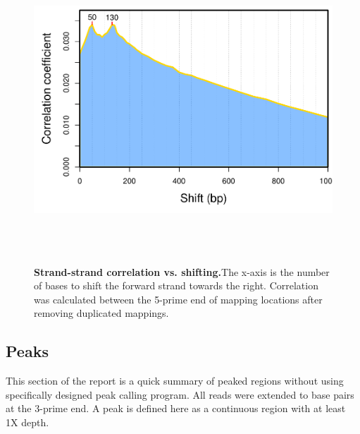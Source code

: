 \documentclass{article}
\begin{document}
\begin{center}
\begin{figure}[H]
\includegraphics[width=6.5in, height=4.5in, page=1]{bamchop-chip-strand-corr}
\caption{\textbf{Strand-strand correlation vs. shifting.}The x-axis is the number of bases to shift the forward strand towards the right. Correlation was calculated between the 5-prime end of mapping locations after removing duplicated mappings.}
\end{figure}
\end{center}

\subsection{Peaks}
This section of the report is a quick summary of peaked regions without using specifically designed peak calling program. All reads were extended to  base pairs at the 3-prime end. A peak is defined here as a continuous region with at least 1X depth. 
\end{document}
